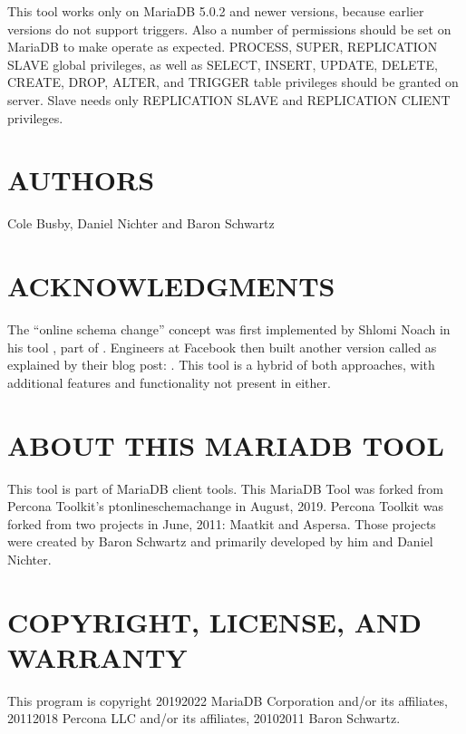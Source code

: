 \documentclass[letterpaper,10pt,english]{sphinxmanual}
\begin{document}
This tool works only on MariaDB 5.0.2 and newer versions, because earlier versions
do not support triggers. Also a number of permissions should be set on MariaDB
to make  operate as expected. PROCESS, SUPER, REPLICATION SLAVE
global privileges, as well as SELECT, INSERT, UPDATE, DELETE, CREATE, DROP, ALTER,
and TRIGGER table privileges should be granted on server. Slave needs only
REPLICATION SLAVE and REPLICATION CLIENT privileges.


\section{AUTHORS}
\label{\detokenize{mariadb-schema-change:authors}}
Cole Busby, Daniel Nichter and Baron Schwartz


\section{ACKNOWLEDGMENTS}
\label{\detokenize{mariadb-schema-change:acknowledgments}}
The “online schema change” concept was first implemented by Shlomi Noach
in his tool , part of
.  Engineers at Facebook then built
another version called  as explained by their blog
post: . This tool is a hybrid of both approaches,
with additional features and functionality not present in either.


\section{ABOUT THIS MARIADB TOOL}
\label{\detokenize{mariadb-schema-change:about-this-mariadb-tool}}
This tool is part of MariaDB client tools. This MariaDB Tool was forked from
Percona Toolkit’s pt\sphinxhyphen{}online\sphinxhyphen{}schema\sphinxhyphen{}change in August, 2019. Percona Toolkit was
forked from two projects in June, 2011: Maatkit and Aspersa.  Those projects
were created by Baron Schwartz and primarily developed by him and Daniel Nichter.


\section{COPYRIGHT, LICENSE, AND WARRANTY}
\label{\detokenize{mariadb-schema-change:copyright-license-and-warranty}}
This program is copyright 2019\sphinxhyphen{}2022 MariaDB Corporation and/or its affiliates,
2011\sphinxhyphen{}2018 Percona LLC and/or its affiliates, 2010\sphinxhyphen{}2011 Baron Schwartz.
\end{document}
